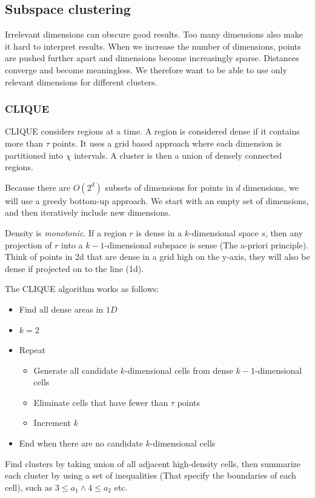 \subsection{Subspace clustering}
    Irrelevant dimensions can obscure good results. Too many dimensions also make it hard to interpret results. When we increase the number of dimensions, points are pushed further apart and dimensions become increasingly sparse. Distances converge and become meaningless. We therefore want to be able to use only relevant dimensions for different clusters. 
    
    
\subsubsection{CLIQUE}
    CLIQUE considers regions at a time. A region is considered dense if it contains more than $\tau$ points. It uses a grid based approach where each dimension is partitioned into $\chi$ intervals. A cluster is then a union of densely connected regions. 
    
    Because there are $O(2^d)$ subsets of dimensions for points in $d$ dimensions, we will use a greedy bottom-up approach. We start with an empty set of dimensions, and then iteratively include new dimensions.
    
    Density is \emph{monotonic}. If a region $r$ is dense in a $k$-dimensional space $s$, then any projection of $r$ into a $k-1$-dimensional subspace is sense (The a-priori principle). Think of points in 2d that are dense in a grid high on the y-axis, they will also be dense if projected on to the line (1d). 
    
    The CLIQUE algorithm works as follows:
    \begin{itemize}
        \item Find all dense areas in $1D$
        \item $k = 2$
        \item Repeat \begin{itemize}
            \item Generate all candidate $k$-dimensional cells from dense $k-1$-dimensional cells
            \item Eliminate cells that have fewer than $\tau$ points
            \item Increment $k$
        \end{itemize}
        \item End when there are no candidate $k$-dimensional cells
    \end{itemize}
    Find clusters by taking union of all adjacent high-density cells, then summarize each cluster by using a set of inequalities (That specify the boundaries of each cell), such as $3 \leq a_1 \land 4 \leq a_2$ etc.
    
